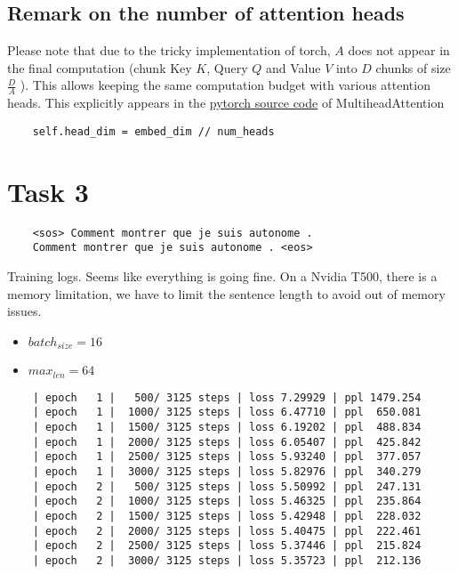 \documentclass[a4paper]{article}
\begin{document}
\subsection*{Remark on the number of attention heads}
Please note that due to the tricky implementation of torch,
$A$ does not appear in the final computation (chunk Key $K$, Query $Q$ and Value $V$ into $D$ chunks of  size $\frac{D}{A}$ ).
This allows keeping the same computation budget with various attention heads.
This explicitly appears in the \href{https://github.com/pytorch/pytorch/blob/main/torch/nn/modules/activation.py#L990}{pytorch source code}
of MultiheadAttention
\begin{verbatim}
    self.head_dim = embed_dim // num_heads
\end{verbatim}

\section*{Task 3}
\begin{verbatim}
    <sos> Comment montrer que je suis autonome .
    Comment montrer que je suis autonome . <eos>
\end{verbatim}

Training logs. Seems like everything is going fine.
On a Nvidia T500, there is a memory limitation, we have to limit the sentence length to avoid out of memory issues.


\begin{itemize}
    \item $batch_{size} = 16$
    \item $max_{len} = 64$
\end{itemize}

\begin{verbatim}
    | epoch   1 |   500/ 3125 steps | loss 7.29929 | ppl 1479.254
    | epoch   1 |  1000/ 3125 steps | loss 6.47710 | ppl  650.081
    | epoch   1 |  1500/ 3125 steps | loss 6.19202 | ppl  488.834
    | epoch   1 |  2000/ 3125 steps | loss 6.05407 | ppl  425.842
    | epoch   1 |  2500/ 3125 steps | loss 5.93240 | ppl  377.057
    | epoch   1 |  3000/ 3125 steps | loss 5.82976 | ppl  340.279
    | epoch   2 |   500/ 3125 steps | loss 5.50992 | ppl  247.131
    | epoch   2 |  1000/ 3125 steps | loss 5.46325 | ppl  235.864
    | epoch   2 |  1500/ 3125 steps | loss 5.42948 | ppl  228.032
    | epoch   2 |  2000/ 3125 steps | loss 5.40475 | ppl  222.461
    | epoch   2 |  2500/ 3125 steps | loss 5.37446 | ppl  215.824
    | epoch   2 |  3000/ 3125 steps | loss 5.35723 | ppl  212.136
\end{verbatim}
\end{document}
